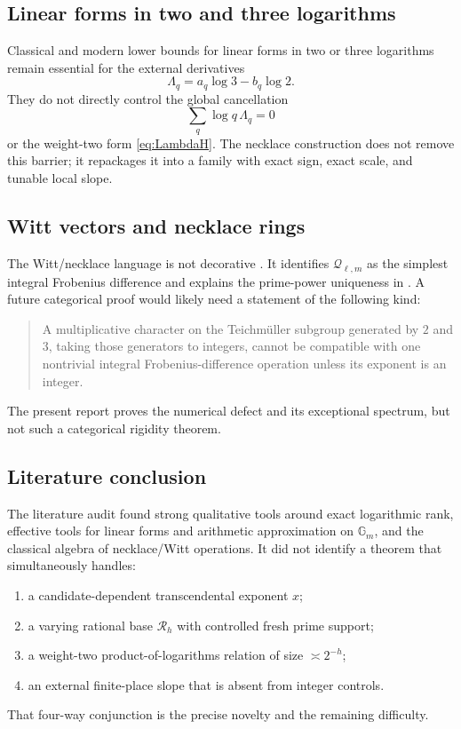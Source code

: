 \documentclass[11pt]{article}
\numberwithin{equation}{section}
\theoremstyle{definition}
\theoremstyle{remark}
\begin{document}
\subsection{Linear forms in two and three logarithms}

Classical and modern lower bounds for linear forms in two or three logarithms remain essential \cite{LMN,Matveev} for the external derivatives
\[
  \Lambda_q=a_q\log3-b_q\log2.
\]
They do not directly control the global cancellation
\[
  \sum_q\log q\,\Lambda_q=0
\]
or the weight-two form \eqref{eq:LambdaH}.  The necklace construction does not remove this barrier; it repackages it into a family with exact sign, exact scale, and tunable local slope.

\subsection{Witt vectors and necklace rings}

The Witt/necklace language is not decorative \cite{MetropolisRota,Hazewinkel}.  It identifies $\mathcal Q_{\ell,m}$ as the simplest integral Frobenius difference and explains the prime-power uniqueness in .  A future categorical proof would likely need a statement of the following kind:
\begin{quote}
A multiplicative character on the Teichm\"uller subgroup generated by $2$ and $3$, taking those generators to integers, cannot be compatible with one nontrivial integral Frobenius-difference operation unless its exponent is an integer.
\end{quote}
The present report proves the numerical defect and its exceptional spectrum, but not such a categorical rigidity theorem.

\subsection{Literature conclusion}

The literature audit found strong qualitative tools around exact logarithmic rank, effective tools for linear forms and arithmetic approximation on $\mathbb G_m$, and the classical algebra of necklace/Witt operations.  It did not identify a theorem that simultaneously handles:
\begin{enumerate}[label=(\roman*)]
  \item a candidate-dependent transcendental exponent $x$;
  \item a varying rational base $\mathcal R_h$ with controlled fresh prime support;
  \item a weight-two product-of-logarithms relation of size $\asymp2^{-h}$;
  \item an external finite-place slope that is absent from integer controls.
\end{enumerate}
That four-way conjunction is the precise novelty and the remaining difficulty.
\end{document}
